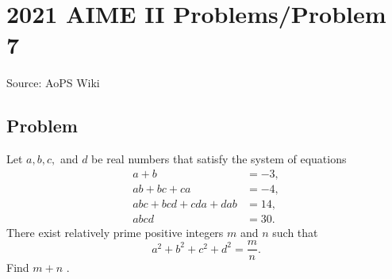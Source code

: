 \documentclass[12pt]{article}
\begin{document}
\section*{{2021 AIME II Problems/Problem 7}}
Source: AoPS Wiki

\subsection*{Problem}
Let $a, b, c,$ and $d$ be real numbers that satisfy the system of equations \begin{align*} a + b &= -3, \\ ab + bc + ca &= -4, \\ abc + bcd + cda + dab &= 14, \\ abcd &= 30. \end{align*} There exist relatively prime positive integers $m$ and $n$ such that \[a^2 + b^2 + c^2 + d^2 = \frac{m}{n}.\] Find $m + n$ .
\end{document}
